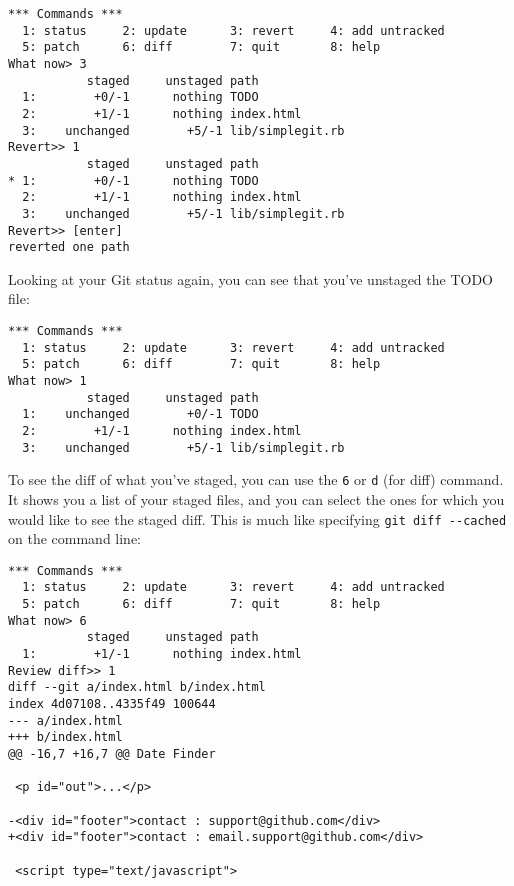 \documentclass[a4paper]{book}
\begin{document}
\begin{shaded}\begin{verbatim}
*** Commands ***
  1: status     2: update      3: revert     4: add untracked
  5: patch      6: diff        7: quit       8: help
What now> 3
           staged     unstaged path
  1:        +0/-1      nothing TODO
  2:        +1/-1      nothing index.html
  3:    unchanged        +5/-1 lib/simplegit.rb
Revert>> 1
           staged     unstaged path
* 1:        +0/-1      nothing TODO
  2:        +1/-1      nothing index.html
  3:    unchanged        +5/-1 lib/simplegit.rb
Revert>> [enter]
reverted one path
\end{verbatim}\end{shaded}

Looking at your Git status again, you can see that you've unstaged the TODO file:

\begin{shaded}\begin{verbatim}
*** Commands ***
  1: status     2: update      3: revert     4: add untracked
  5: patch      6: diff        7: quit       8: help
What now> 1
           staged     unstaged path
  1:    unchanged        +0/-1 TODO
  2:        +1/-1      nothing index.html
  3:    unchanged        +5/-1 lib/simplegit.rb
\end{verbatim}\end{shaded}

To see the diff of what you've staged, you can use the \texttt{6} or \texttt{d} (for diff) command. It shows you a list of your staged files, and you can select the ones for which you would like to see the staged diff. This is much like specifying \texttt{git diff -{}-cached} on the command line:

\begin{shaded}\begin{verbatim}
*** Commands ***
  1: status     2: update      3: revert     4: add untracked
  5: patch      6: diff        7: quit       8: help
What now> 6
           staged     unstaged path
  1:        +1/-1      nothing index.html
Review diff>> 1
diff --git a/index.html b/index.html
index 4d07108..4335f49 100644
--- a/index.html
+++ b/index.html
@@ -16,7 +16,7 @@ Date Finder

 <p id="out">...</p>

-<div id="footer">contact : support@github.com</div>
+<div id="footer">contact : email.support@github.com</div>

 <script type="text/javascript">
\end{verbatim}\end{shaded}
\end{document}
